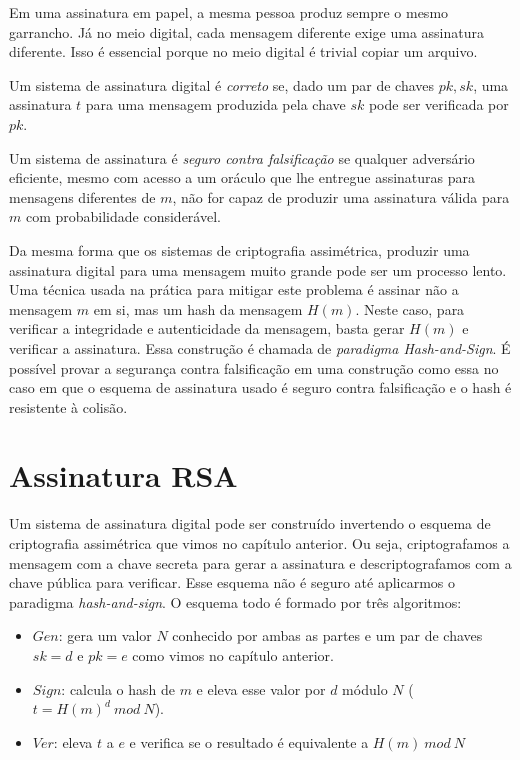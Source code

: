 Em uma assinatura em papel, a mesma pessoa produz sempre o mesmo garrancho.
Já no meio digital, cada mensagem diferente exige uma assinatura diferente.
Isso é essencial porque no meio digital é trivial copiar um arquivo.

Um sistema de assinatura digital é {\em correto} se, dado um par de chaves $pk, sk$, uma assinatura $t$ para uma mensagem produzida pela chave $sk$ pode ser verificada por $pk$.

Um sistema de assinatura é {\em seguro contra falsificação} se qualquer adversário eficiente, mesmo com acesso a um oráculo que lhe entregue assinaturas para mensagens diferentes de $m$, não for capaz de produzir uma assinatura válida para $m$ com probabilidade considerável.

Da mesma forma que os sistemas de criptografia assimétrica, produzir uma assinatura digital para uma mensagem muito grande pode ser um processo lento.
Uma técnica usada na prática para mitigar este problema é assinar não a mensagem $m$ em si, mas um hash da mensagem $H(m)$.
Neste caso, para verificar a integridade e autenticidade da mensagem, basta gerar $H(m)$ e verificar a assinatura.
Essa construção é chamada de {\em paradigma Hash-and-Sign}.
É possível provar a segurança contra falsificação em uma construção como essa no caso em que o esquema de assinatura usado é seguro contra falsificação e o hash é resistente à colisão.

\section{Assinatura RSA}
\label{sec:assinatura-rsa}
Um sistema de assinatura digital pode ser construído invertendo o esquema de criptografia assimétrica que vimos no capítulo anterior.
Ou seja, criptografamos a mensagem com a chave secreta para gerar a assinatura e descriptografamos com a chave pública para verificar.
Esse esquema não é seguro até aplicarmos o paradigma {\em hash-and-sign}.
O esquema todo é formado por três algoritmos:

\begin{itemize}
\item $Gen$: gera um valor $N$ conhecido por ambas as partes e um par de chaves $sk = d$ e $pk = e$ como vimos no capítulo anterior.
\item $Sign$: calcula o hash de $m$ e eleva esse valor por $d$ módulo $N$ ($t = H(m)^d\ mod\ N$).
\item $Ver$: eleva $t$ a $e$ e verifica se o resultado é equivalente a $H(m)\ mod\ N$ 
\end{itemize}


